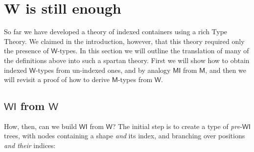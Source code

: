 \documentclass[a4paper]{article}
\makeatletter
\newcommand{\Conid}[1]{\mathit{#1}}
\newcommand{\Varid}[1]{\mathit{#1}}
\newcommand{\anonymous}{\kern0.06em \vbox{\hrule\@width.5em}}
\def\resethooks{%
  \global\let\SaveRestoreHook\empty
  \global\let\ColumnHook\empty}
\newcommand{\hsindent}[1]{\quad}%
\renewcommand\Varid[1]{\mathord{\textsf{#1}}}
\let\Conid\Varid
\makeatother
\begin{document}
\resethooks



\section{W is still enough}
\label{sec:w-enough}



So far we have developed a theory of indexed containers using a rich Type
Theory. We claimed in the introduction, however, that this theory required
only the presence of \ensuremath{\Conid{W}}-types. In this section we will outline the
translation of many of the definitions above into such a spartan theory.
First we will show how to obtain indexed \ensuremath{\Conid{W}}-types from un-indexed ones, and
by analogy \ensuremath{\Conid{MI}} from \ensuremath{\Conid{M}}, and then we will revisit a proof of how to derive
\ensuremath{\Conid{M}}-types from \ensuremath{\Conid{W}}.


\subsection*{\ensuremath{\Conid{WI}} from \ensuremath{\Conid{W}}}
\label{wifromw}

How, then, can we build \ensuremath{\Conid{WI}} from \ensuremath{\Conid{W}}? The initial step is to create a type
of \emph{pre}-\ensuremath{\Conid{WI}} trees, with nodes containing a shape \emph{and} its index,
and branching over positions \emph{and their} indices:
\end{document}
